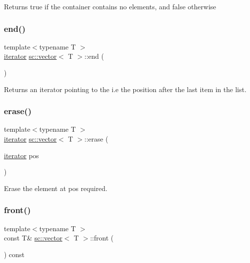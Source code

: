 Returns true if the container contains no elements, and false otherwise \mbox{\label{classsc_1_1vector_a92378196850ffdcc094f266d40cc2cc5}} 
\subsubsection{\texorpdfstring{end()}{end()}}
{\footnotesize\ttfamily template$<$typename T $>$ \\
\hyperlink{classsc_1_1vector_1_1iterator}{iterator} \hyperlink{classsc_1_1vector}{sc\+::vector}$<$ T $>$\+::end (\begin{DoxyParamCaption}{ }\end{DoxyParamCaption})\hspace{0.3cm}{\ttfamily [inline]}}



Returns an iterator pointing to the i.\+e the position after the last item in the list. 

\mbox{\label{classsc_1_1vector_a9dcc8ea80726caae68ac935ca677abfe}} 
\subsubsection{\texorpdfstring{erase()}{erase()}}
{\footnotesize\ttfamily template$<$typename T $>$ \\
\hyperlink{classsc_1_1vector_1_1iterator}{iterator} \hyperlink{classsc_1_1vector}{sc\+::vector}$<$ T $>$\+::erase (\begin{DoxyParamCaption}\item[{\hyperlink{classsc_1_1vector_1_1iterator}{iterator}}]{pos }\end{DoxyParamCaption})\hspace{0.3cm}{\ttfamily [inline]}}



Erase the element at pos required. 

\mbox{\label{classsc_1_1vector_a85da6164a082030bd04de354d657da0d}} 
\subsubsection{\texorpdfstring{front()}{front()}}
{\footnotesize\ttfamily template$<$typename T $>$ \\
const T\& \hyperlink{classsc_1_1vector}{sc\+::vector}$<$ T $>$\+::front (\begin{DoxyParamCaption}{ }\end{DoxyParamCaption}) const\hspace{0.3cm}{\ttfamily [inline]}}

